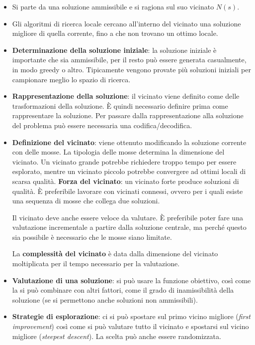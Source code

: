 \begin{itemize}
	\item Si parte da una soluzione ammissibile e si ragiona sul suo vicinato $N(s)$.
	\item Gli algoritmi di ricerca locale cercano all'interno del vicinato una soluzione migliore di quella corrente, fino a che non trovano un ottimo locale.
	\item \textbf{Determinazione della soluzione iniziale}: la soluzione iniziale è importante che sia ammissibile, per il resto può essere generata casualmente, in modo greedy o altro. Tipicamente vengono provate più soluzioni iniziali per campionare meglio lo spazio di ricerca.
	\item \textbf{Rappresentazione della soluzione}: il vicinato viene definito come delle trasformazioni della soluzione. \`E quindi necessario definire prima come rappresentare la soluzione. Per passare dalla rappresentazione alla soluzione del problema può essere necessaria una codifica/decodifica.
	\item \textbf{Definizione del vicinato}: viene ottenuto modificando la soluzione corrente con delle mosse. La tipologia delle mosse determina la dimensione del vicinato. Un vicinato grande potrebbe richiedere troppo tempo per essere esplorato, mentre un vicinato piccolo potrebbe convergere ad ottimi locali di scarsa qualità. \textbf{Forza del vicinato}: un vicinato forte produce soluzioni di qualità. \`E preferibile lavorare con vicinati connessi, ovvero per i quali esiste una sequenza di mosse che collega due soluzioni.
	
	Il vicinato deve anche essere veloce da valutare. \`E preferibile poter fare una valutazione incrementale a partire dalla soluzione centrale, ma perché questo sia possibile è necessario che le mosse siano limitate.
	
	La \textbf{complessità del vicinato} è data dalla dimensione del vicinato moltiplicata per il tempo necessario per la valutazione.
	
	\item \textbf{Valutazione di una soluzione}: si può usare la funzione obiettivo, così come la si può combinare con altri fattori, come il grado di inamissibilità della soluzione (se si permettono anche soluzioni non ammissibili).
	
	\item \textbf{Strategie di esplorazione}: ci si può spostare sul primo vicino migliore (\textit{first improvement}) così come si può valutare tutto il vicinato e spostarsi sul vicino migliore (\textit{steepest descent}). La scelta può anche essere randomizzata.
	

\end{itemize}
